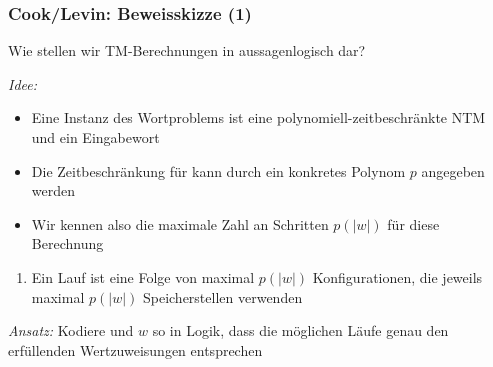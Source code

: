 \documentclass[aspectratio=1610,onlymath]{beamer}
\begin{document}
\begin{frame}\frametitle{Cook/Levin: Beweisskizze (1)}

\alert{Wie stellen wir TM-Berechnungen in aussagenlogisch dar?}
\bigskip

\emph{Idee:}
\begin{itemize}
\item Eine Instanz des Wortproblems ist eine polynomiell-zeitbeschränkte NTM  und ein Eingabewort
\item Die Zeitbeschränkung für  kann durch ein konkretes Polynom $p$ angegeben werden
\item Wir kennen also die maximale Zahl an Schritten $p(|w|)$ für diese Berechnung
\end{itemize}
\begin{enumerate}[$\leadsto$]
\item Ein Lauf ist eine Folge von maximal $p(|w|)$ Konfigurationen, die jeweils maximal $p(|w|)$ Speicherstellen verwenden
\end{enumerate}
\bigskip

\emph{Ansatz:} Kodiere  und $w$ so in Logik, dass die möglichen Läufe genau den erfüllenden Wertzuweisungen entsprechen

\end{frame}
\end{document}
